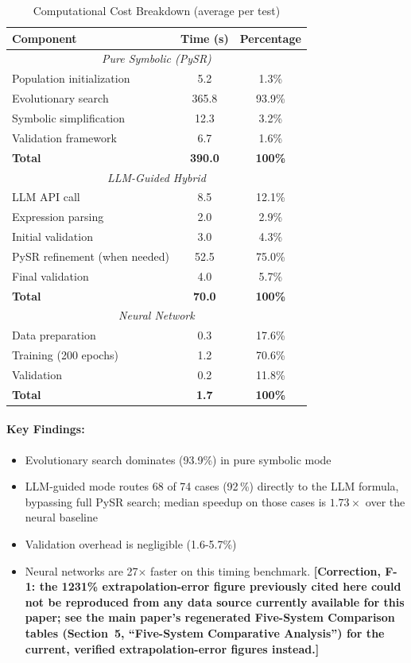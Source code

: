 \documentclass[twoside,11pt]{article}
\begin{document}
\begin{table}[H]
\centering
\caption{Computational Cost Breakdown (average per test)}
\label{tab:timing_breakdown}
\begin{tabular}{@{}lcc@{}}
\toprule
\textbf{Component} & \textbf{Time (s)} & \textbf{Percentage} \\
\midrule
\multicolumn{3}{c}{\textit{Pure Symbolic (PySR)}} \\
\midrule
Population initialization & 5.2 & 1.3\% \\
Evolutionary search & 365.8 & 93.9\% \\
Symbolic simplification & 12.3 & 3.2\% \\
Validation framework & 6.7 & 1.6\% \\
\midrule
\textbf{Total} & \textbf{390.0} & \textbf{100\%} \\
\midrule
\multicolumn{3}{c}{\textit{LLM-Guided Hybrid}} \\
\midrule
LLM API call & 8.5 & 12.1\% \\
Expression parsing & 2.0 & 2.9\% \\
Initial validation & 3.0 & 4.3\% \\
PySR refinement (when needed) & 52.5 & 75.0\% \\
Final validation & 4.0 & 5.7\% \\
\midrule
\textbf{Total} & \textbf{70.0} & \textbf{100\%} \\
\midrule
\multicolumn{3}{c}{\textit{Neural Network}} \\
\midrule
Data preparation & 0.3 & 17.6\% \\
Training (200 epochs) & 1.2 & 70.6\% \\
Validation & 0.2 & 11.8\% \\
\midrule
\textbf{Total} & \textbf{1.7} & \textbf{100\%} \\
\bottomrule
\end{tabular}
\end{table}

\paragraph{Key Findings:}
\begin{itemize}
\item Evolutionary search dominates (93.9\%) in pure symbolic mode
\item LLM-guided mode routes 68 of 74 cases (92\,\%) directly to the LLM formula, bypassing full PySR search; median speedup on those cases is $1.73\times$ over the neural baseline \citep{kambhampati2024llms}
\item Validation overhead is negligible (1.6-5.7\%)
\item Neural networks are 27$\times$ faster on this timing benchmark. \textbf{[Correction, F-1: the 1231\% extrapolation-error figure previously cited here could not be reproduced from any data source currently available for this paper; see the main paper's regenerated Five-System Comparison tables (Section~5, ``Five-System Comparative Analysis'') for the current, verified extrapolation-error figures instead.]}
\end{itemize}
\end{document}
